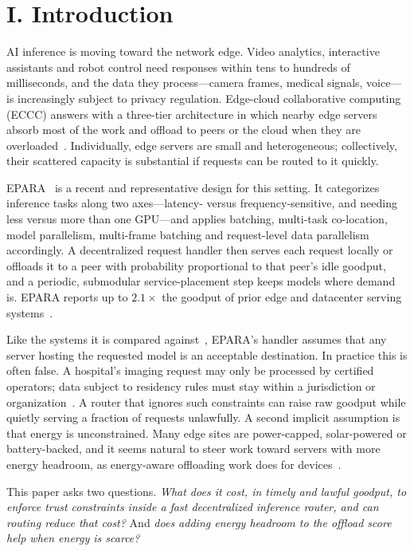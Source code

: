 \documentclass{article}
\begin{document}
\section*{I. Introduction}

AI inference is moving toward the network edge. Video analytics, interactive assistants and robot control need responses within tens to hundreds of milliseconds, and the data they process---camera frames, medical signals, voice---is increasingly subject to privacy regulation. Edge-cloud collaborative computing (ECCC) answers with a three-tier architecture in which nearby edge servers absorb most of the work and offload to peers or the cloud when they are overloaded~\cite{liu2025eccc}. Individually, edge servers are small and heterogeneous; collectively, their scattered capacity is substantial if requests can be routed to it quickly.

EPARA~\cite{epara2025} is a recent and representative design for this setting. It categorizes inference tasks along two axes---latency- versus frequency-sensitive, and needing less versus more than one GPU---and applies batching, multi-task co-location, model parallelism, multi-frame batching and request-level data parallelism accordingly. A decentralized request handler then serves each request locally or offloads it to a peer with probability proportional to that peer's idle goodput, and a periodic, submodular service-placement step keeps models where demand is. EPARA reports up to $2.1\times$ the goodput of prior edge and datacenter serving systems~\cite{epara2025}.

Like the systems it is compared against~\cite{interedge,galaxy,servp,alpaserve,usher}, EPARA's handler assumes that any server hosting the requested model is an acceptable destination. In practice this is often false. A hospital's imaging request may only be processed by certified operators; data subject to residency rules must stay within a jurisdiction or organization~\cite{gdpr}. A router that ignores such constraints can raise raw goodput while quietly serving a fraction of requests unlawfully. A second implicit assumption is that energy is unconstrained. Many edge sites are power-capped, solar-powered or battery-backed, and it seems natural to steer work toward servers with more energy headroom, as energy-aware offloading work does for devices~\cite{mao2016harvest,min2019privacy}.

This paper asks two questions. \emph{What does it cost, in timely and lawful goodput, to enforce trust constraints inside a fast decentralized inference router, and can routing reduce that cost?} And \emph{does adding energy headroom to the offload score help when energy is scarce?}
\end{document}
